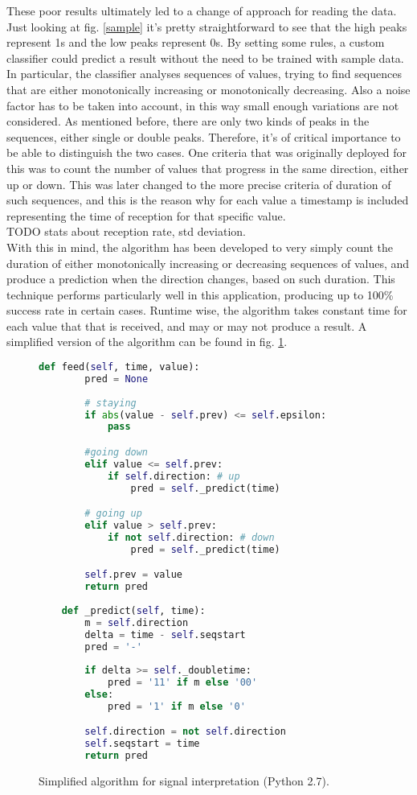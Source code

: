 These poor results ultimately led to a change of approach for reading the data. 
Just looking at fig. \ref{sample} it's pretty straightforward to see that the high peaks represent 1s and the low peaks represent 0s. 
By setting some rules, a custom classifier could predict a result without the need to be trained with sample data.
In particular, the classifier analyses sequences of values, trying to find sequences that are either monotonically increasing or monotonically decreasing.
Also a noise factor has to be taken into account, in this way small enough variations are not considered.
As mentioned before, there are only two kinds of peaks in the sequences, either single or double peaks.
Therefore, it's of critical importance to be able to distinguish the two cases. One criteria that was originally deployed for this was to count the number of values that progress in the same direction, either up or down. This was later changed to the more precise criteria of duration of such sequences, and this is the reason why for each value a timestamp is included representing the time of reception for that specific value.\\ TODO stats about reception rate, std deviation.\\
With this in mind, the algorithm has been developed to very simply count the duration of either monotonically increasing or decreasing sequences of values, and produce a prediction when the direction changes, based on such duration.
This technique performs particularly well in this application, producing up to 100\% success rate in certain cases.
 Runtime wise, the algorithm takes constant time for each value that that is received, and may or may not produce a result.
A simplified version of the algorithm can be found in fig. \ref{code}.
\begin{figure}
\centering
\begin{lstlisting}[language=Python, frame={}]
	def feed(self, time, value):
		pred = None
		
		# staying
		if abs(value - self.prev) <= self.epsilon:
			pass

		#going down
		elif value <= self.prev: 
			if self.direction: # up	
				pred = self._predict(time)

		# going up
		elif value > self.prev: 
			if not self.direction: # down
				pred = self._predict(time)

		self.prev = value
		return pred
		
	def _predict(self, time):
		m = self.direction
		delta = time - self.seqstart
		pred = '-'
		
		if delta >= self._doubletime:
			pred = '11' if m else '00'
		else:
			pred = '1' if m else '0'

		self.direction = not self.direction
		self.seqstart = time
		return pred
\end{lstlisting}
\label{code}
\caption{Simplified algorithm for signal interpretation (Python 2.7).}
\end{figure}

